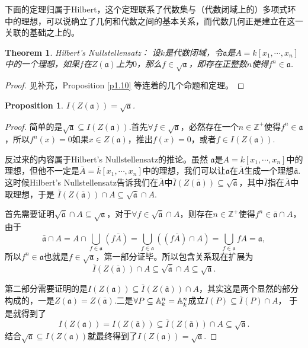 \documentclass[9pt]{extarticle}
\theoremstyle{plain}%
\newtheorem{pro}[defi]{Proposition}%
\newtheorem{theo}[defi]{Theorem}%
\begin{document}
下面的定理归属于Hilbert，这个定理联系了代数集与（代数闭域上的）多项式环中的理想，可以说确立了几何和代数之间的基本关系，而代数几何正是建立在这一关联的基础之上的。
\begin{theo}Hilbert's Nullstellensatz：
设$k$是代数闭域，令$\mathfrak{a}$是$A=k[x_1,\cdots ,x_n]$中的一个理想，如果$f$在$Z(\mathfrak{a})$上为$0$，那么$f\in \sqrt{\mathfrak{a}}$，即存在正整数$n$使得$f^n\in \mathfrak{a}$.
\end{theo}
\begin{proof}
见补充，Proposition \ref{p1.10} 等连着的几个命题和定理。
\end{proof}
\begin{pro}
$I(Z(\mathfrak{a}))=\sqrt{\mathfrak{a}}$. 
\end{pro}
\begin{proof}
简单的是$\sqrt{\mathfrak{a}}\subseteq I(Z(\mathfrak{a}))$.首先$\forall f\in \sqrt{\mathfrak{a}}$，必然存在一个$n\in \mathbb{Z}^+$使得$f^n\in \mathfrak{a}$，所以$f^n(x)=0$如果$x\in Z(\mathfrak{a})$，推出$f(x)=0$，或者$f\in I(Z(\mathfrak{a}))$.

反过来的内容属于Hilbert's Nullstellensatz的推论。虽然
$\mathfrak{a}$是$A=k[x_1,\cdots,x_n]$中的理想，但他不一定是$\bar{A}=\bar{k}[x_1,\cdots,x_n]$中的理想，我们可以让$\mathfrak{a}$在$\bar{A}$生成一个理想$\bar{\mathfrak{a}}$.这时候Hilbert's Nullstellensatz告诉我们在$\bar{A}$中$\bar{I}(Z(\bar{\mathfrak{a}}))\subseteq\sqrt{\bar{\mathfrak{a}}}$，其中$\bar{I}$指在$\bar{A}$中取理想，于是
$
	\bar{I}(Z(\bar{\mathfrak{a}}))\cap A\subseteq\sqrt{\bar{\mathfrak{a}}}\cap A.
$

首先需要证明$\sqrt{\bar{\mathfrak{a}}}\cap A\subseteq \sqrt{\mathfrak{a}}$，对于$\forall f\in \sqrt{\bar{\mathfrak{a}}}\cap A$，则存在$n\in \mathbb{Z}^+$使得$f^n\in \bar{\mathfrak{a}}\cap A$，由于
\[
	\bar{\mathfrak{a}}\cap A=A\cap\bigcup_{f\in\mathfrak{a}}(f\bar{A})=\bigcup_{f\in\mathfrak{a}}((f\bar{A})\cap A)=\bigcup_{f\in\mathfrak{a}}fA=\mathfrak{a},
\]
所以$f^n\in \mathfrak{a}$也就是$f\in \sqrt{\mathfrak{a}}$，第一部分证毕。所以包含关系现在扩展为
\[
	\bar{I}(Z(\bar{\mathfrak{a}}))\cap A\subseteq\sqrt{\bar{\mathfrak{a}}}\cap A\subseteq \sqrt{\mathfrak{a}}.
\]

第二部分需要证明的是$I(Z(\mathfrak{a}))\subseteq \bar{I}(Z(\bar{\mathfrak{a}}))\cap A$，其实这是两个显然的部分构成的，一是$Z(\mathfrak{a})=Z(\bar{\mathfrak{a}})$.二是$\forall P\subseteq \mathbb{A}^n_k=\mathbb{A}^n_{\bar{k}}$成立$I(P)\subseteq \bar{I}(P)\cap A$，
于是就得到了
\[
	I(Z(\mathfrak{a}))=I(Z(\bar{\mathfrak{a}}))\subseteq \bar{I}(Z(\bar{\mathfrak{a}}))\cap A\subseteq \sqrt{\mathfrak{a}}.
\]
结合$\sqrt{\mathfrak{a}}\subseteq I(Z(\mathfrak{a}))$就最终得到了$I(Z(\mathfrak{a}))=\sqrt{\mathfrak{a}}$.
\end{proof}
\end{document}
